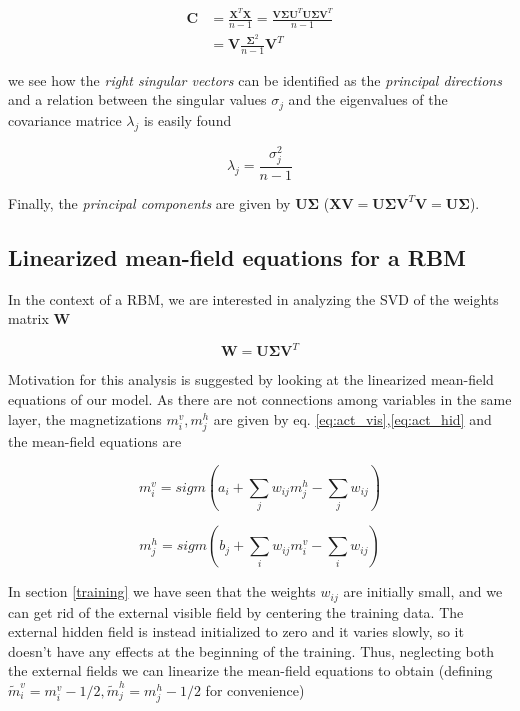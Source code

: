 \documentclass[notitlepage]{revtex4-1}
\begin{document}
\begin{align}
\mathbf{C} & = \frac{\mathbf{X}^T \mathbf{X}}{n-1} = \frac{\mathbf{V \Sigma U}^T \mathbf{U \Sigma V}^T}{n-1}  \\ \nonumber
& = \mathbf{V} \frac{\mathbf{\Sigma}^2}{n-1} \mathbf{V}^T \nonumber 
\end{align}

we see how the \textit{right singular vectors} can be identified as the \textit{principal directions} and a relation between the singular values \(\sigma_j\) and the eigenvalues of the covariance matrice \(\lambda_j\) is easily found

\begin{equation}
\lambda_j = \frac{\sigma_j^2}{n-1}
\label{eq:ls_map}
\end{equation}

Finally, the \textit{principal components} are given by \(\mathbf{U \Sigma}\) (\(\mathbf{XV} = \mathbf{U \Sigma V}^T \mathbf{V} = \mathbf{U \Sigma}\)).

\subsection{Linearized mean-field equations for a RBM}
In the context of a RBM, we are interested in analyzing the SVD of the weights matrix \(\mathbf{W}\)

\begin{equation}
\mathbf{W} = \mathbf{U \Sigma V}^T
\end{equation}

Motivation for this analysis is suggested by looking at the linearized mean-field equations \cite{Nishimori} of our model. As there are not connections among variables in the same layer, the magnetizations \(m_i^v,m_j^h\) are given by eq. \eqref{eq:act_vis},\eqref{eq:act_hid} and the mean-field equations are

\begin{equation}
m_i^v = sigm \left(a_i + \sum_{j} w_{ij} m_j^h - \sum_j w_{ij} \right)
\end{equation}

\begin{equation}
m_j^h = sigm \left(b_j + \sum_i w_{ij} m^v_i - \sum_i w_{ij}\right)
\end{equation}

In section \ref{training} we have seen that the weights \(w_{ij}\) are initially small, and we can get rid of the external visible field by centering the training data. The external hidden field is instead initialized to zero and it varies slowly, so it doesn't have any effects at the beginning of the training. Thus, neglecting both the external fields we can linearize the mean-field equations to obtain (defining \( \tilde{m}_i^v = m_i^v - 1/2, \tilde{m}_j^h = m_j^h - 1/2 \) for convenience)
\end{document}
